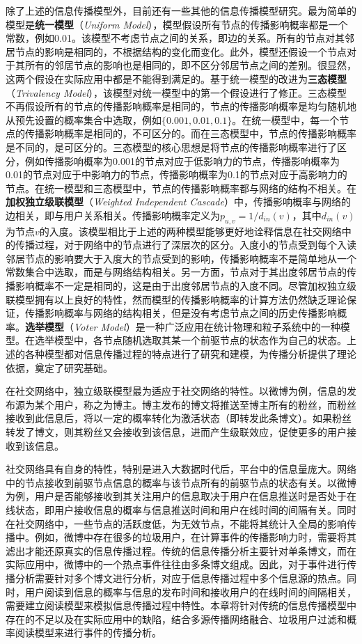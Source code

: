除了上述的信息传播模型外，目前还有一些其他的信息传播模型研究。最为简单的模型是\textbf{统一模型}（\textit{Uniform Model}），模型假设所有节点的传播影响概率都是一个常数，例如0.01。该模型不考虑节点之间的关系，即边的关系。所有的节点对其邻居节点的影响是相同的，不根据结构的变化而变化。此外，模型还假设一个节点对于其所有的邻居节点的影响也是相同的，即不区分邻居节点之间的差别。很显然，这两个假设在实际应用中都是不能得到满足的。基于统一模型的改进为\textbf{三态模型}（\textit{Trivalency Model}），该模型对统一模型中的第一个假设进行了修正。三态模型不再假设所有的节点的传播影响概率是相同的，节点的传播影响概率是均匀随机地从预先设置的概率集合中选取，例如$\{0.001,0.01,0.1\}$。在统一模型中，每一个节点的传播影响概率是相同的，不可区分的。而在三态模型中，节点的传播影响概率是不同的，是可区分的。三态模型的核心思想是将节点的传播影响概率进行了区分，例如传播影响概率为0.001的节点对应于低影响力的节点，传播影响概率为0.01的节点对应于中影响力的节点，传播影响概率为0.1的节点对应于高影响力的节点。在统一模型和三态模型中，节点的传播影响概率都与网络的结构不相关。在\textbf{加权独立级联模型}（\textit{Weighted Independent Cascade}）中，传播影响概率与网络的边相关，即与用户关系相关。传播影响概率定义为$p_{u,v}=1 / d_{in}\left(v\right)$，其中$d_{in}\left(v\right)$为节点$v$的入度。该模型相比于上述的两种模型能够更好地诠释信息在社交网络中的传播过程，对于网络中的节点进行了深层次的区分。入度小的节点受到每个入读邻居节点的影响要大于入度大的节点受到的影响，传播影响概率不是简单地从一个常数集合中选取，而是与网络结构相关。另一方面，节点对于其出度邻居节点的传播影响概率不一定是相同的，这是由于出度邻居节点的入度不同。尽管加权独立级联模型拥有以上良好的特性，然而模型的传播影响概率的计算方法仍然缺乏理论保证，传播影响概率与网络的结构相关，但是没有考虑节点之间的历史传播影响概率。\textbf{选举模型}（\textit{Voter Model}）是一种广泛应用在统计物理和粒子系统中的一种模型。在选举模型中，各节点随机选取其某一个前驱节点的状态作为自己的状态。上述的各种模型都对信息传播过程的特点进行了研究和建模，为传播分析提供了理论依据，奠定了研究基础。

在社交网络中，独立级联模型最为适应于社交网络的特性。以微博为例，信息的发布源为某个用户，称之为博主。博主发布的博文将推送至博主所有的粉丝，而粉丝接收到此信息后，将以一定的概率转化为激活状态（即转发此条博文）。如果粉丝转发了博文，则其粉丝又会接收到该信息，进而产生级联效应，促使更多的用户接收到该信息。

社交网络具有自身的特性，特别是进入大数据时代后，平台中的信息量庞大。网络中的节点接收到前驱节点信息的概率与该节点所有的前驱节点的状态有关。以微博为例，用户是否能够接收到其关注用户的信息取决于用户在信息推送时是否处于在线状态，即用户接收信息的概率与信息推送时间和用户在线时间的间隔有关。同时在社交网络中，一些节点的活跃度低，为无效节点，不能将其统计入全局的影响传播中。例如，微博中存在很多的垃圾用户，在计算事件的传播影响力时，需要将其滤出才能还原真实的信息传播过程。传统的信息传播分析主要针对单条博文，而在实际应用中，微博中的一个热点事件往往由多条博文组成。因此，对于事件进行传播分析需要针对多个博文进行分析，对应于信息传播过程中多个信息源的热点。同时，用户阅读到信息的概率与信息的发布时间和接收用户的在线时间的间隔相关，需要建立阅读模型来模拟信息传播过程中特性。本章将针对传统的信息传播模型中存在的不足以及在实际应用中的缺陷，结合多源传播网络融合、垃圾用户过滤和概率阅读模型来进行事件的传播分析。

